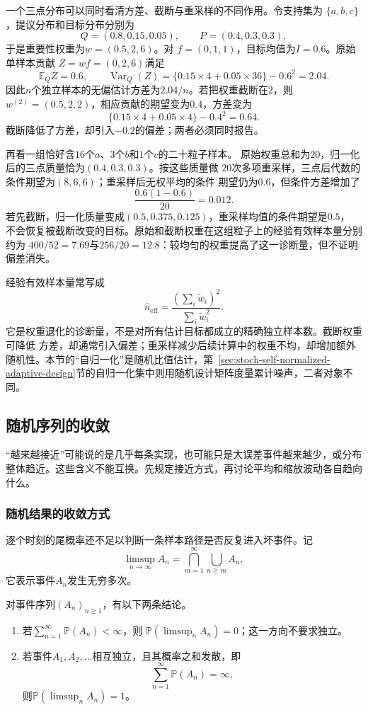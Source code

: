 一个三点分布可以同时看清方差、截断与重采样的不同作用。令支持集为
\(\{a,b,c\}\)，提议分布和目标分布分别为
\[
  Q=(0.8,0.15,0.05),\qquad
  P=(0.4,0.3,0.3),
\]
于是重要性权重为\(w=(0.5,2,6)\)。对
\(f=(0,1,1)\)，目标均值为\(I=0.6\)。原始单样本贡献
\(Z=wf=(0,2,6)\)满足
\[
  \mathbb{E}_Q Z=0.6,\qquad
  \operatorname{Var}_Q(Z)
  =\{0.15\times4+0.05\times36\}-0.6^2
  =2.04.
\]
因此\(n\)个独立样本的无偏估计方差为\(2.04/n\)。若把权重截断在\(2\)，则
\(w^{(2)}=(0.5,2,2)\)，相应贡献的期望变为\(0.4\)，方差变为
\[
  \{0.15\times4+0.05\times4\}-0.4^2=0.64.
\]
截断降低了方差，却引入\(-0.2\)的偏差；两者必须同时报告。

再看一组恰好含\(16\)个\(a\)、\(3\)个\(b\)和\(1\)个\(c\)的二十粒子样本。
原始权重总和为\(20\)，归一化后的三点质量恰为\((0.4,0.3,0.3)\)。按这些质量做
\(20\)次多项重采样，三点后代数的条件期望为\((8,6,6)\)；重采样后无权平均的条件
期望仍为\(0.6\)，但条件方差增加了
\[
  \frac{0.6(1-0.6)}{20}=0.012.
\]
若先截断，归一化质量变成\((0.5,0.375,0.125)\)，重采样均值的条件期望是\(0.5\)，
不会恢复被截断改变的目标。原始和截断权重在这组粒子上的经验有效样本量分别约为
\(400/52=7.69\)与\(256/20=12.8\)：较均匀的权重提高了这一诊断量，但不证明偏差消失。

经验有效样本量常写成
\[ \widehat{n}_{\mathrm{eff}}
  =\frac{(\sum_i\widetilde{w}_i)^2}{\sum_i\widetilde{w}_i^2}. \]
它是权重退化的诊断量，不是对所有估计目标都成立的精确独立样本数。截断权重可降低
方差，却通常引入偏差；重采样减少后续计算中的权重不均，却增加额外随机性。本节的“自归一化”是随机比值估计，第~\ref{sec:stoch-self-normalized-adaptive-design}节的自归一化集中则用随机设计矩阵度量累计噪声，二者对象不同。

\subsection{随机序列的收敛}
\label{sec:probability-random-convergence-asymptotics}
“越来越接近”可能说的是几乎每条实现，也可能只是大误差事件越来越少，或分布整体趋近。这些含义不能互换。先规定接近方式，再讨论平均和缩放波动各自趋向什么。

\subsubsection{随机结果的收敛方式}
\label{sec:rv-numerical-convergence}
逐个时刻的尾概率还不足以判断一条样本路径是否反复进入坏事件。记
\[
  \limsup_{n\to\infty}A_n
  =
  \bigcap_{m=1}^{\infty}\bigcup_{n\geq m}A_n,
\]
它表示事件\(A_n\)发生无穷多次。
\begin{theorem}
  \label{thm:probability-borel-cantelli}
  对事件序列\((A_n)_{n\geq1}\)，有以下两条结论。
  \begin{enumerate}
    \item 若\(\sum_{n=1}^{\infty}\mathbb{P}(A_n)<\infty\)，则
    \(\mathbb{P}(\limsup_n A_n)=0\)；这一方向不要求独立。
    \item 若事件\(A_1,A_2,\ldots\)相互独立，且其概率之和发散，即
    \[
      \sum_{n=1}^{\infty}\mathbb{P}(A_n)=\infty,
    \]
    则\(\mathbb{P}(\limsup_n A_n)=1\)。
  \end{enumerate}
\end{theorem}

